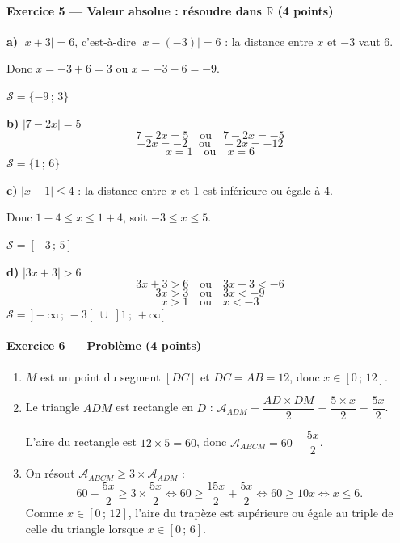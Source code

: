\documentclass[11pt,a4paper]{article}
\newcommand{\R}{\mathbb{R}}
\renewcommand{\S}{\mathcal{S}}
\renewcommand{\iff}{\Longleftrightarrow}
\newcommand{\exo}[3]{\paragraph{Exercice #1 --- #2 \hfill\normalfont\small(#3 points)}}
\newcommand{\rep}[1]{\textbf{#1}}
\begin{document}
\exo{5}{Valeur absolue : résoudre dans $\R$}{4}
\begin{minipage}[t]{0.47\linewidth}
\rep{a)} $|x + 3| = 6$, c'est-à-dire $|x - (-3)| = 6$ : la distance entre $x$ et $-3$ vaut $6$.

Donc $x = -3 + 6 = 3$ ou $x = -3 - 6 = -9$.

$\S = \{-9\,;\,3\}$

\medskip
\rep{b)} $|7 - 2x| = 5$
\[ 7 - 2x = 5 \quad\text{ou}\quad 7 - 2x = -5 \]
\[ -2x = -2 \quad\text{ou}\quad -2x = -12 \]
\[ x = 1 \quad\text{ou}\quad x = 6 \]
$\S = \{1\,;\,6\}$

\end{minipage}\hfill
\begin{minipage}[t]{0.47\linewidth}
\rep{c)} $|x - 1| \leqslant 4$ : la distance entre $x$ et $1$ est inférieure ou égale à $4$.

Donc $1 - 4 \leqslant x \leqslant 1 + 4$, soit $-3 \leqslant x \leqslant 5$.

$\S = [-3\,;\,5]$

\medskip
\rep{d)} $|3x + 3| > 6$
\[ 3x + 3 > 6 \quad\text{ou}\quad 3x + 3 < -6 \]
\[ 3x > 3 \quad\text{ou}\quad 3x < -9 \]
\[ x > 1 \quad\text{ou}\quad x < -3 \]
$\S = \,]-\infty\,;\,-3[ \;\cup\; ]1\,;\,+\infty[$
\end{minipage}

\exo{6}{Problème}{4}
\begin{enumerate}[leftmargin=1.6em, itemsep=0.4em, topsep=0.2em]
  \item[\rep{1.}] $M$ est un point du segment $[DC]$ et $DC = AB = 12$, donc $x \in [0\,;\,12]$.
  \item[\rep{2.}] Le triangle $ADM$ est rectangle en $D$ :
  $\mathcal{A}_{ADM} = \dfrac{AD \times DM}{2} = \dfrac{5 \times x}{2} = \dfrac{5x}{2}$.

  L'aire du rectangle est $12 \times 5 = 60$, donc $\mathcal{A}_{ABCM} = 60 - \dfrac{5x}{2}$.
  \item[\rep{3.}] On résout $\mathcal{A}_{ABCM} \geqslant 3 \times \mathcal{A}_{ADM}$ :
  \[ 60 - \dfrac{5x}{2} \geqslant 3 \times \dfrac{5x}{2} \iff 60 \geqslant \dfrac{15x}{2} + \dfrac{5x}{2} \iff 60 \geqslant 10x \iff x \leqslant 6. \]
  Comme $x \in [0\,;\,12]$, l'aire du trapèze est supérieure ou égale au triple de celle du triangle lorsque $x \in [0\,;\,6]$.
\end{enumerate}
\end{document}
